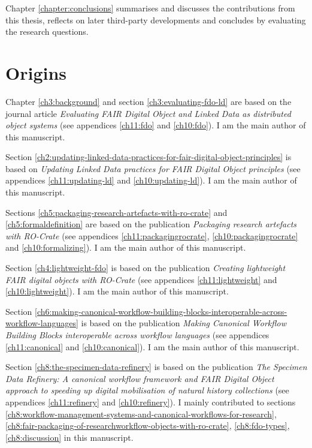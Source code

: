 Chapter \vref{chapter:conclusions} summarises and discusses the contributions from this thesis, reflects on later third-party developments and concludes by evaluating the research questions.


\section{Origins}
\label{intro:origins}

Chapter \ref{ch3:background} and section \ref{ch3:evaluating-fdo-ld} are based on the journal article \emph{Evaluating FAIR Digital Object and Linked Data as distributed object systems} \cite{Soiland-Reyes 2023c}  (see appendices \ref{ch11:fdo} and \ref{ch10:fdo}). I am the main author of this manuscript.

Section \ref{ch2:updating-linked-data-practices-for-fair-digital-object-principles} is based on \emph{Updating Linked Data practices for FAIR Digital Object principles} \cite{Soiland-Reyes 2022d} (see appendices \ref{ch11:updating-ld} and \ref{ch10:updating-ld}). I am the main author of this manuscript.

Sections \ref{ch5:packaging-research-artefacts-with-ro-crate} and \ref{ch5:formaldefinition} are based on the publication \emph{Packaging research artefacts with RO-Crate} \cite{Soiland-Reyes 2022a} (see appendices \ref{ch11:packagingrocrate}, \ref{ch10:packagingrocrate} and \ref{ch10:formalizing}). I am the main author of this manuscript.

Section \ref{ch4:lightweight-fdo} is based on the publication \emph{Creating lightweight FAIR digital objects with RO-Crate} \cite{Soiland-Reyes 2022c} (see appendices \ref{ch11:lightweight} and \ref{ch10:lightweight}). I am the main author of this manuscript.

Section \ref{ch6:making-canonical-workflow-building-blocks-interoperable-across-workflow-languages} is based on the publication \emph{Making Canonical Workflow Building Blocks interoperable across workflow languages} \cite{Soiland-Reyes 2022b} (see appendices \ref{ch11:canonical} and \ref{ch10:canonical}). I am the main author of this manuscript.

Section \ref{ch8:the-specimen-data-refinery} is based on the publication \emph{The Specimen Data Refinery: A
canonical workflow framework and FAIR Digital Object approach to speeding up digital mobilisation of natural history collections} \cite{Hardisty 2022} (see appendices \ref{ch11:refinery} and \ref{ch10:refinery}). I mainly contributed to sections \ref{ch8:workflow-management-systems-and-canonical-workflows-for-research}, \ref{ch8:fair-packaging-of-researchworkflow-objects-with-ro-crate}, \ref{ch8:fdo-types}, \ref{ch8:discussion} in this manuscript.

